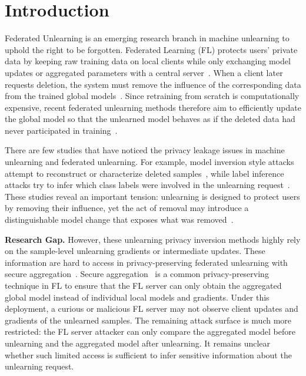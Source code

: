 \section{Introduction} \label{intro}


Federated Unlearning is an emerging research branch in machine unlearning to uphold the right to be forgotten. Federated Learning (FL) protects users' private data by keeping raw training data on local clients while only exchanging model updates or aggregated parameters with a central server~\citep{li2020federated,salehi2022flash,zhang2021dual}. 
When a client later requests deletion, the system must remove the influence of the corresponding data from the trained global models~\citep{wang2022federated,liu2022right}. Since retraining from scratch is computationally expensive, recent federated unlearning methods therefore aim to efficiently update the global model so that the unlearned model behaves as if the deleted data had never participated in training~\citep{wang2024fedu,liu2022right}. 




There are few studies that have noticed the privacy leakage issues in machine unlearning and federated unlearning. For example, model inversion style attacks attempt to reconstruct or characterize deleted samples~\citep{hu2024learn}, while label inference attacks try to infer which class labels were involved in the unlearning request~\citep{wang2025label}. These studies reveal an important tension: unlearning is designed to protect users by removing their influence, yet the act of removal may introduce a distinguishable model change that exposes what was removed~\citep{chen2021machine, hu2024learn, wang2025label, zhou2026model}.

\noindent
\textbf{Research Gap.}
However, these unlearning privacy inversion methods highly rely on the sample-level unlearning gradients or intermediate updates. These information are hard to access in privacy-preserving federated unlearning with secure aggregation~\citep{so2023securing}. Secure aggregation~\citep{so2023securing, bonawitz2017practical,guan2025input} is a common privacy-preserving technique in FL to ensure that the FL server can only obtain the aggregated global model instead of individual local models and gradients. Under this deployment, a curious or malicious FL server may not observe client updates and gradients of the unlearned samples. The remaining attack surface is much more restricted: the FL server attacker can only compare the aggregated model before unlearning and the aggregated model after unlearning. It remains unclear whether such limited access is sufficient to infer sensitive information about the unlearning request.


